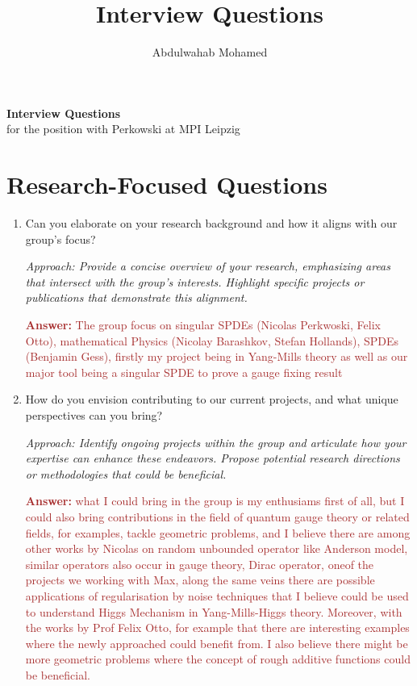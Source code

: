 \documentclass[12pt]{article}
\title{Interview Questions}
\author{Abdulwahab Mohamed}
\numberwithin{equation}{section}
\newcommand{\brown}[1]{\textcolor{brown}{#1}}
\begin{document}
\begin{center}
    {\Large \textbf{Interview Questions}} \\ \vspace{1pt}
    for the position with Perkowski at MPI Leipzig \\\vspace{0.5cm}
\end{center}

\section{Research-Focused Questions}
\begin{enumerate}
    \item Can you elaborate on your research background and how it aligns with our group's focus?
    
    \textit{Approach: Provide a concise overview of your research, emphasizing areas that intersect with the group's interests. Highlight specific projects or publications that demonstrate this alignment.}

    \brown{\textbf{Answer:} The group focus on singular SPDEs (Nicolas Perkwoski, Felix Otto), mathematical Physics (Nicolay Barashkov, Stefan Hollands), SPDEs (Benjamin Gess), firstly my project being in Yang-Mills theory as well as our major tool being a singular SPDE to prove a gauge fixing result}

    \item How do you envision contributing to our current projects, and what unique perspectives can you bring?
    
    \textit{Approach: Identify ongoing projects within the group and articulate how your expertise can enhance these endeavors. Propose potential research directions or methodologies that could be beneficial.}

    \brown{\textbf{Answer:} what I could bring in the group is my enthusiams first of all, but I could also bring contributions in the field of quantum gauge theory or related fields, for examples, tackle geometric problems, and I believe there are among other works by Nicolas on random unbounded operator like Anderson model, similar operators also occur in gauge theory, Dirac operator, oneof the projects we working with Max, along the same veins there are possible applications of regularisation by noise techniques that I believe could be used to understand Higgs Mechanism in Yang-Mills-Higgs theory. Moreover, with the works by Prof Felix Otto,     for example that there are interesting examples where the newly approached could benefit from. I also believe there might be more geometric problems where the concept of rough additive functions could be beneficial. }
    


\end{enumerate}
\end{document}

